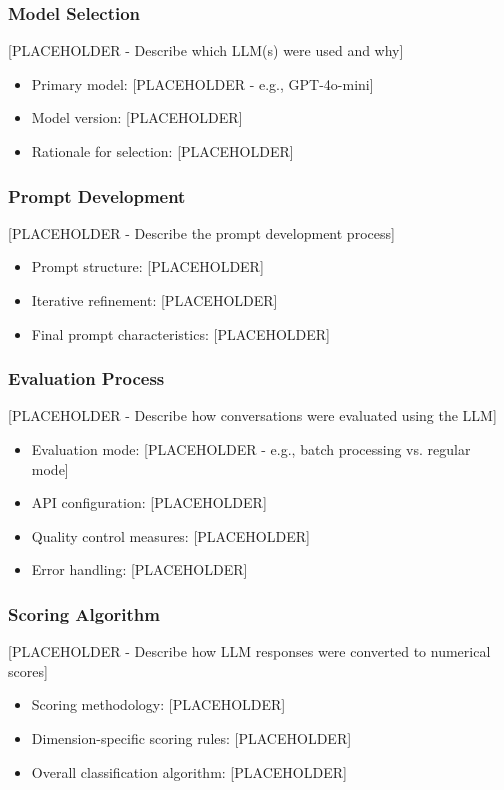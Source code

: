 \documentclass[12pt]{article}
\begin{document}
\subsubsection{Model Selection}

[PLACEHOLDER - Describe which LLM(s) were used and why]
\begin{itemize}
    \item Primary model: [PLACEHOLDER - e.g., GPT-4o-mini]
    \item Model version: [PLACEHOLDER]
    \item Rationale for selection: [PLACEHOLDER]
\end{itemize}

\subsubsection{Prompt Development}

[PLACEHOLDER - Describe the prompt development process]
\begin{itemize}
    \item Prompt structure: [PLACEHOLDER]
    \item Iterative refinement: [PLACEHOLDER]
    \item Final prompt characteristics: [PLACEHOLDER]
\end{itemize}

\subsubsection{Evaluation Process}

[PLACEHOLDER - Describe how conversations were evaluated using the LLM]
\begin{itemize}
    \item Evaluation mode: [PLACEHOLDER - e.g., batch processing vs. regular mode]
    \item API configuration: [PLACEHOLDER]
    \item Quality control measures: [PLACEHOLDER]
    \item Error handling: [PLACEHOLDER]
\end{itemize}

\subsubsection{Scoring Algorithm}

[PLACEHOLDER - Describe how LLM responses were converted to numerical scores]
\begin{itemize}
    \item Scoring methodology: [PLACEHOLDER]
    \item Dimension-specific scoring rules: [PLACEHOLDER]
    \item Overall classification algorithm: [PLACEHOLDER]
\end{itemize}
\end{document}

